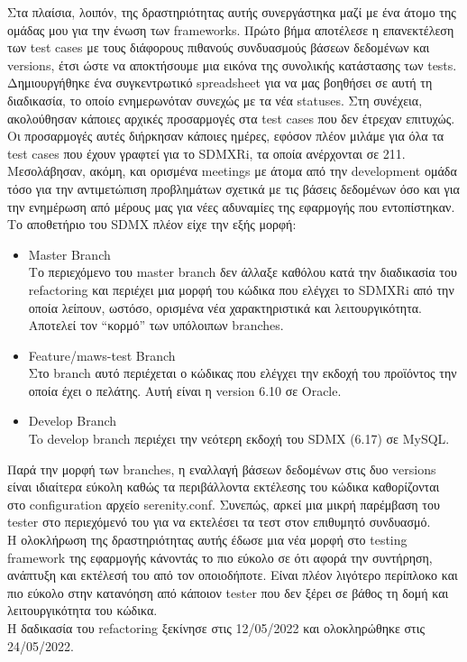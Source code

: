 Στα πλαίσια, λοιπόν, της δραστηριότητας αυτής συνεργάστηκα μαζί με ένα άτομο της ομάδας μου για την ένωση των frameworks. Πρώτο βήμα αποτέλεσε η επανεκτέλεση των test 
cases με τους διάφορους πιθανούς συνδυασμούς βάσεων δεδομένων και versions, έτσι ώστε να αποκτήσουμε μια εικόνα της συνολικής κατάστασης των tests. Δημιουργήθηκε ένα 
συγκεντρωτικό spreadsheet για να μας βοηθήσει σε αυτή τη διαδικασία, το οποίο ενημερωνόταν συνεχώς με τα νέα statuses. Στη συνέχεια, ακολούθησαν κάποιες αρχικές προσαρμογές στα test cases που δεν έτρεχαν επιτυχώς. 
Οι προσαρμογές αυτές διήρκησαν κάποιες ημέρες, εφόσον πλέον μιλάμε για όλα τα test cases που έχουν γραφτεί για το SDMXRi, τα οποία ανέρχονται σε 211. Μεσολάβησαν, ακόμη, και ορισμένα meetings με άτομα από 
την development ομάδα τόσο για την αντιμετώπιση προβλημάτων σχετικά με τις βάσεις δεδομένων όσο και για την ενημέρωση από μέρους μας για νέες αδυναμίες της εφαρμογής που εντοπίστηκαν. Το αποθετήριο 
του SDMX πλέον είχε την εξής μορφή:
\begin{itemize}
    \item Master Branch\\ Το περιεχόμενο του master branch δεν άλλαξε καθόλου κατά την διαδικασία του refactoring και περιέχει μια μορφή του κώδικα που ελέγχει το SDMXRi από την οποία λείπουν, ωστόσο, ορισμένα 
    νέα χαρακτηριστικά και λειτουργικότητα. Αποτελεί τον ``κορμό'' των υπόλοιπων branches.
    \item Feature/maws-test Branch\\ Στο branch αυτό περιέχεται ο κώδικας που ελέγχει την εκδοχή του προϊόντος την οποία έχει ο πελάτης. Αυτή είναι η version 6.10 σε Oracle.
	\item Develop Branch\\ To develop branch περιέχει την νεότερη εκδοχή του SDMX (6.17) σε MySQL.
\end{itemize}
Παρά την μορφή των branches, η εναλλαγή βάσεων δεδομένων στις δυο versions είναι ιδιαίτερα εύκολη καθώς τα περιβάλλοντα εκτέλεσης του κώδικα καθορίζονται στο configuration αρχείο serenity.conf. 
Συνεπώς, αρκεί μια μικρή παρέμβαση του tester στο περιεχόμενό του για να εκτελέσει τα τεστ στον επιθυμητό συνδυασμό.\\
Η ολοκλήρωση της δραστηριότητας αυτής έδωσε μια νέα μορφή στο testing framework της εφαρμογής κάνοντάς το πιο εύκολο σε ότι αφορά την συντήρηση, ανάπτυξη και εκτέλεσή του από τον οποιοδήποτε. Είναι πλέον λιγότερο 
περίπλοκο και πιο εύκολο στην κατανόηση από κάποιον tester που δεν ξέρει σε βάθος τη δομή και λειτουργικότητα του κώδικα.\\
Η δαδικασία του refactoring ξεκίνησε στις 12/05/2022 και ολοκληρώθηκε στις 24/05/2022.

